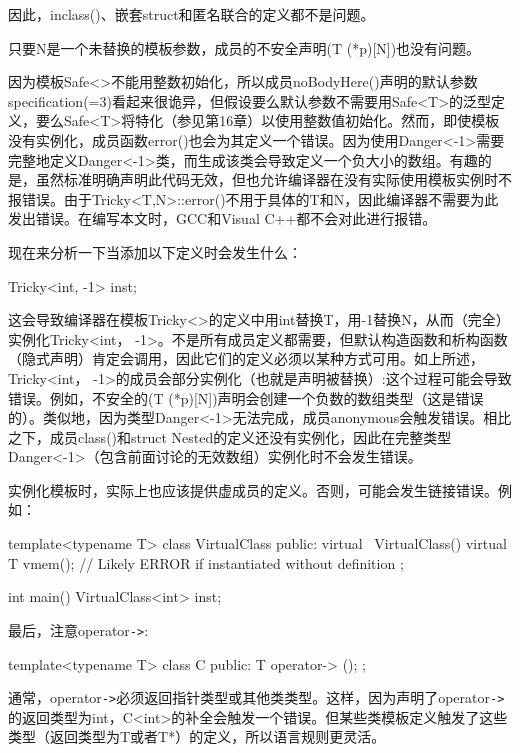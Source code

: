 因此，inclass()、嵌套struct和匿名联合的定义都不是问题。

只要N是一个未替换的模板参数，成员的不安全声明(T (*p)[N])也没有问题。

因为模板Safe<>不能用整数初始化，所以成员noBodyHere()声明的默认参数specification(=3)看起来很诡异，但假设要么默认参数不需要用Safe<T>的泛型定义，要么Safe<T>将特化（参见第16章）以使用整数值初始化。然而，即使模板没有实例化，成员函数error()也会为其定义一个错误。因为使用Danger<-1>需要完整地定义Danger<-1>类，而生成该类会导致定义一个负大小的数组。有趣的是，虽然标准明确声明此代码无效，但也允许编译器在没有实际使用模板实例时不报错误。由于Tricky<T,N>::error()不用于具体的T和N，因此编译器不需要为此发出错误。在编写本文时，GCC和Visual C++都不会对此进行报错。

现在来分析一下当添加以下定义时会发生什么：

\begin{cpp}
Tricky<int, -1> inst;
\end{cpp}

这会导致编译器在模板Tricky<>的定义中用int替换T，用-1替换N，从而（完全）实例化Tricky<int， -1>。不是所有成员定义都需要，但默认构造函数和析构函数（隐式声明）肯定会调用，因此它们的定义必须以某种方式可用。如上所述，Tricky<int， -1>的成员会部分实例化（也就是声明被替换）:这个过程可能会导致错误。例如，不安全的(T (*p)[N])声明会创建一个负数的数组类型（这是错误的）。类似地，因为类型Danger<-1>无法完成，成员anonymous会触发错误。相比之下，成员class()和struct Nested的定义还没有实例化，因此在完整类型Danger<-1>（包含前面讨论的无效数组）实例化时不会发生错误。

实例化模板时，实际上也应该提供虚成员的定义。否则，可能会发生链接错误。例如：

\begin{cpp}
template<typename T>
class VirtualClass {
	public:
	virtual ~VirtualClass() {}
	virtual T vmem(); // Likely ERROR if instantiated without definition
};

int main()
{
	VirtualClass<int> inst;
}
\end{cpp}

最后，注意operator\texttt{->}:

\begin{cpp}
template<typename T>
class C {
	public:
	T operator-> ();
};
\end{cpp}

通常，operator\texttt{->}必须返回指针类型或其他类类型。这样，因为声明了operator\texttt{->}的返回类型为int，C<int>的补全会触发一个错误。但某些类模板定义触发了这些类型（返回类型为T或者T*）的定义，所以语言规则更灵活。

